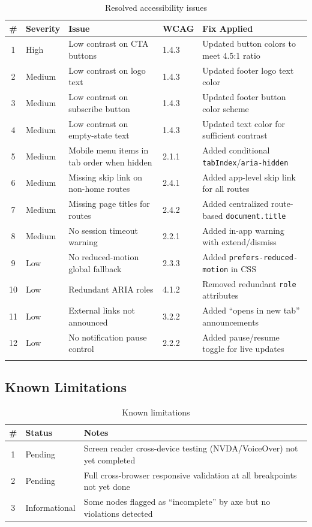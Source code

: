 \documentclass[12pt,a4paper]{article}
\begin{document}
\begin{longtable}{clp{2.8cm}p{1.8cm}p{4.5cm}}
\toprule
\textbf{\#} & \textbf{Severity} & \textbf{Issue} & \textbf{WCAG} & \textbf{Fix Applied} \\
\midrule
\endhead
1  & High   & Low contrast on CTA buttons              & 1.4.3 & Updated button colors to meet 4.5:1 ratio \\
2  & Medium & Low contrast on logo text                 & 1.4.3 & Updated footer logo text color \\
3  & Medium & Low contrast on subscribe button          & 1.4.3 & Updated footer button color scheme \\
4  & Medium & Low contrast on empty-state text          & 1.4.3 & Updated text color for sufficient contrast \\
5  & Medium & Mobile menu items in tab order when hidden & 2.1.1 & Added conditional \texttt{tabIndex}/\texttt{aria-hidden} \\
6  & Medium & Missing skip link on non-home routes      & 2.4.1 & Added app-level skip link for all routes \\
7  & Medium & Missing page titles for routes            & 2.4.2 & Added centralized route-based \texttt{document.title} \\
8  & Medium & No session timeout warning                & 2.2.1 & Added in-app warning with extend/dismiss \\
9  & Low    & No reduced-motion global fallback         & 2.3.3 & Added \texttt{prefers-reduced-motion} in CSS \\
10 & Low    & Redundant ARIA roles                      & 4.1.2 & Removed redundant \texttt{role} attributes \\
11 & Low    & External links not announced              & 3.2.2 & Added ``opens in new tab'' announcements \\
12 & Low    & No notification pause control             & 2.2.2 & Added pause/resume toggle for live updates \\
\bottomrule
\caption{Resolved accessibility issues}
\end{longtable}

\subsection{Known Limitations}

\begin{table}[H]
\centering
\begin{tabularx}{\textwidth}{clX}
\toprule
\textbf{\#} & \textbf{Status} & \textbf{Notes} \\
\midrule
1 & Pending       & Screen reader cross-device testing (NVDA/VoiceOver) not yet completed \\
2 & Pending       & Full cross-browser responsive validation at all breakpoints not yet done \\
3 & Informational & Some nodes flagged as ``incomplete'' by axe but no violations detected \\
\bottomrule
\end{tabularx}
\caption{Known limitations}
\end{table}
\end{document}
